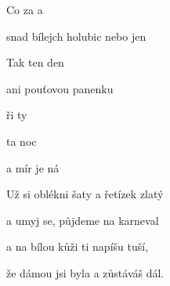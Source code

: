 

      

\zs
Co  za  a  

snad  bílejch holubic nebo jen 

Tak  ten  den  

ani pouťovou panenku 
\ks

\zr
{}ři  ty   

  ta  noc 

a mír je  ná
\kr

\zs
Už si oblékni šaty a řetízek zlatý

a umyj se, půjdeme na karneval

a na bílou kůži ti napíšu tuší,

že dámou jsi byla a zůstáváš dál.
\ks

\zr  \kr

\kp






















